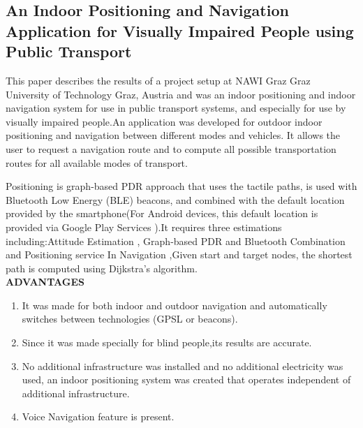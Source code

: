 \documentclass[a4paper, 12pt]{article}
\begin{document}
\subsection{An Indoor Positioning and Navigation Application for Visually Impaired People using Public Transport}
\hspace{1cm}This paper describes the results of a project setup at NAWI Graz Graz University of Technology Graz, Austria  and was an indoor positioning and indoor navigation system for use in public transport systems, and especially for use by visually impaired people.An application was developed for outdoor indoor positioning and navigation between different modes and vehicles. It allows the user to request a navigation route and to compute all possible transportation routes for all available modes of transport.
\par Positioning is graph-based PDR approach that uses the tactile paths, is used with Bluetooth Low Energy (BLE) beacons, and combined with the default location provided by the smartphone(For Android devices, this default location is provided via Google Play Services ).It requires three estimations including:Attitude Estimation , Graph-based PDR and Bluetooth Combination and Positioning service 
In Navigation ,Given start and target nodes, the shortest path is computed using Dijkstra’s algorithm.
\\
\linebreak
\textbf{ADVANTAGES}
\begin{enumerate}
	\item It was made for both indoor and outdoor navigation and automatically switches between technologies (GPSL or beacons).
	\item	Since it was made specially for blind people,its results are accurate. 
	\item	No additional infrastructure was installed and no additional electricity was used, an indoor positioning system was created that operates independent of additional infrastructure.
	\item Voice Navigation feature is present.
	
\end{enumerate}
\end{document}
